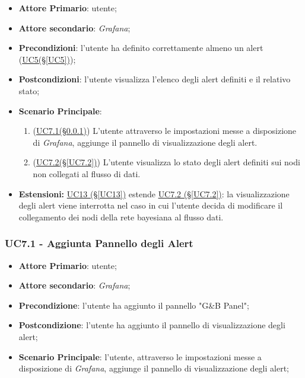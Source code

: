 \begin{itemize}
	\item \textbf{Attore Primario}: utente;
	\item \textbf{Attore secondario}: \textit{Grafana};
	\item \textbf{Precondizioni}: l'utente ha definito correttamente almeno un alert (\hyperref[UC5]{UC5(§\ref*{UC5})});
	\item \textbf{Postcondizioni}: l'utente visualizza l'elenco degli alert definiti e il relativo stato;
	\item \textbf{Scenario Principale}:
	\begin{enumerate}
		\item (\hyperref[UC7.1]{UC7.1(§\ref*{UC7.1})}) L'utente attraverso le impostazioni messe a disposizione di \textit{Grafana}, aggiunge il pannello di visualizzazione degli alert.
		\item (\hyperref[UC7.2]{UC7.2(§\ref*{UC7.2})}) L'utente visualizza lo stato degli alert definiti sui nodi non collegati al flusso di dati.
	\end{enumerate}
	\item \textbf{Estensioni:} \hyperref[UC13]{UC13 (§\ref*{UC13})} estende \hyperref[UC7.2]{UC7.2 (§\ref*{UC7.2})}: la visualizzazione degli alert viene interrotta nel caso in cui l'utente decida di modificare il collegamento dei nodi della rete bayesiana al flusso dati.
\end{itemize}

\newpage

\subsubsection{UC7.1 - Aggiunta Pannello degli Alert }\label{UC7.1}
\begin{itemize}
	\item \textbf{Attore Primario}: utente;
	\item \textbf{Attore secondario}: \textit{Grafana};
	\item \textbf{Precondizione}: l'utente ha aggiunto il pannello "G\&B Panel";
	\item \textbf{Postcondizione}: l'utente ha aggiunto il pannello di visualizzazione degli alert;
	\item \textbf{Scenario Principale}: l'utente, attraverso le impostazioni messe a disposizione di \textit{Grafana}, aggiunge il pannello di visualizzazione degli alert;
\end{itemize}

